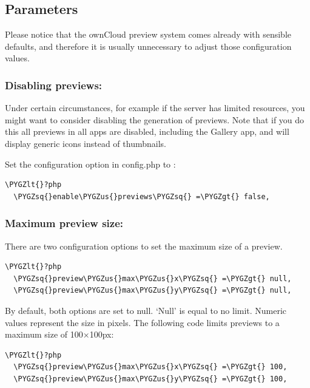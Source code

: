 \documentclass[letterpaper,10pt,english]{sphinxmanual}
\def\PYGZus{\char`\_}
\def\PYGZlt{\char`\<}
\def\PYGZgt{\char`\>}
\def\PYGZsq{\char`\'}
\renewcommand\PYGZsq{\textquotesingle}
\begin{document}
\subsection{Parameters}
\label{configuration_files/previews_configuration:parameters}
Please notice that the ownCloud preview system comes already with sensible
defaults, and therefore it is usually unnecessary to adjust those configuration
values.


\subsubsection{Disabling previews:}
\label{configuration_files/previews_configuration:disabling-previews}
Under certain circumstances, for example if the server has limited
resources, you might want to consider disabling the generation of previews.
Note that if you do this all previews in all apps are disabled, including
the Gallery app, and will display generic icons instead of
thumbnails.

Set the configuration option  in config.php to :

\begin{Verbatim}[commandchars=\\\{\}]
\PYGZlt{}?php
  \PYGZsq{}enable\PYGZus{}previews\PYGZsq{} =\PYGZgt{} false,
\end{Verbatim}


\subsubsection{Maximum preview size:}
\label{configuration_files/previews_configuration:maximum-preview-size}
There are two configuration options to set the maximum size of a preview.

\begin{Verbatim}[commandchars=\\\{\}]
\PYGZlt{}?php
  \PYGZsq{}preview\PYGZus{}max\PYGZus{}x\PYGZsq{} =\PYGZgt{} null,
  \PYGZsq{}preview\PYGZus{}max\PYGZus{}y\PYGZsq{} =\PYGZgt{} null,
\end{Verbatim}

By default, both options are set to null. `Null' is equal to no limit.
Numeric values represent the size in pixels. The following code limits previews
to a maximum size of 100×100px:

\begin{Verbatim}[commandchars=\\\{\}]
\PYGZlt{}?php
  \PYGZsq{}preview\PYGZus{}max\PYGZus{}x\PYGZsq{} =\PYGZgt{} 100,
  \PYGZsq{}preview\PYGZus{}max\PYGZus{}y\PYGZsq{} =\PYGZgt{} 100,
\end{Verbatim}
\end{document}

